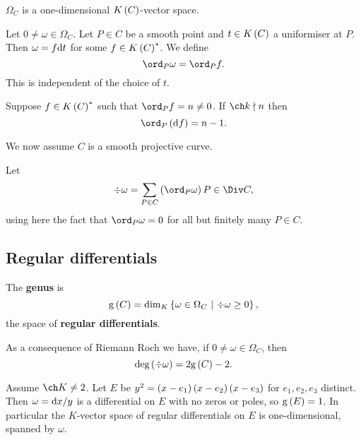 \begin{fact*}
$ \Omega_C $ is a one-dimensional $ K\br{C} $-vector space.
\end{fact*}

Let $ 0 \ne \omega \in \Omega_C $. Let $ P \in C $ be a smooth point and $ t \in K\br{C} $ a uniformiser at $ P $. Then $ \omega = f\mathrm{d} t $ for some $ f \in K\br{C}^* $. We define
$$ \ord_P \omega = \ord_P f. $$
This is independent of the choice of $ t $.

\begin{fact*}
Suppose $ f \in K\br{C}^* $ such that $ \ord_P f = n \ne 0 $. If $ \ch k \nmid n $ then
$$ \ord_P \br{\d f} = n - 1. $$
\end{fact*}

We now assume $ C $ is a smooth projective curve.

\begin{definition*}
Let
$$ \div \omega = \sum_{P \in C} \br{\ord_P \omega}P \in \Div C, $$
using here the fact that $ \ord_P \omega = 0 $ for all but finitely many $ P \in C $.
\end{definition*}

\subsection{Regular differentials}

\begin{definition*}
The \textbf{genus} is
$$ \g\br{C} = \dim_K \cbr{\omega \in \Omega_C \st \div \omega \ge 0}, $$
the space of \textbf{regular differentials}.
\end{definition*}

As a consequence of Riemann Roch we have, if $ 0 \ne \omega \in \Omega_C $, then
$$ \deg \br{\div \omega} = 2\g\br{C} - 2. $$

\begin{lemma}
Assume $ \ch K \ne 2 $. Let $ E $ be $ y^2 = \br{x - e_1}\br{x - e_2}\br{x - e_3} $ for $ e_1, e_2, e_3 $ distinct. Then $ \omega = \mathrm{d} x / y $ is a differential on $ E $ with no zeros or poles, so $ \g\br{E} = 1 $. In particular the $ K $-vector space of regular differentials on $ E $ is one-dimensional, spanned by $ \omega $.
\end{lemma}

